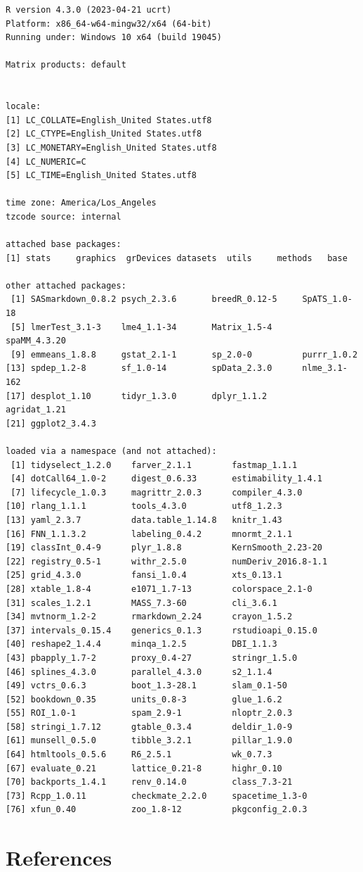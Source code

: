 \documentclass[
]{book}
\begin{document}
\begin{verbatim}
R version 4.3.0 (2023-04-21 ucrt)
Platform: x86_64-w64-mingw32/x64 (64-bit)
Running under: Windows 10 x64 (build 19045)

Matrix products: default


locale:
[1] LC_COLLATE=English_United States.utf8 
[2] LC_CTYPE=English_United States.utf8   
[3] LC_MONETARY=English_United States.utf8
[4] LC_NUMERIC=C                          
[5] LC_TIME=English_United States.utf8    

time zone: America/Los_Angeles
tzcode source: internal

attached base packages:
[1] stats     graphics  grDevices datasets  utils     methods   base     

other attached packages:
 [1] SASmarkdown_0.8.2 psych_2.3.6       breedR_0.12-5     SpATS_1.0-18     
 [5] lmerTest_3.1-3    lme4_1.1-34       Matrix_1.5-4      spaMM_4.3.20     
 [9] emmeans_1.8.8     gstat_2.1-1       sp_2.0-0          purrr_1.0.2      
[13] spdep_1.2-8       sf_1.0-14         spData_2.3.0      nlme_3.1-162     
[17] desplot_1.10      tidyr_1.3.0       dplyr_1.1.2       agridat_1.21     
[21] ggplot2_3.4.3    

loaded via a namespace (and not attached):
 [1] tidyselect_1.2.0    farver_2.1.1        fastmap_1.1.1      
 [4] dotCall64_1.0-2     digest_0.6.33       estimability_1.4.1 
 [7] lifecycle_1.0.3     magrittr_2.0.3      compiler_4.3.0     
[10] rlang_1.1.1         tools_4.3.0         utf8_1.2.3         
[13] yaml_2.3.7          data.table_1.14.8   knitr_1.43         
[16] FNN_1.1.3.2         labeling_0.4.2      mnormt_2.1.1       
[19] classInt_0.4-9      plyr_1.8.8          KernSmooth_2.23-20 
[22] registry_0.5-1      withr_2.5.0         numDeriv_2016.8-1.1
[25] grid_4.3.0          fansi_1.0.4         xts_0.13.1         
[28] xtable_1.8-4        e1071_1.7-13        colorspace_2.1-0   
[31] scales_1.2.1        MASS_7.3-60         cli_3.6.1          
[34] mvtnorm_1.2-2       rmarkdown_2.24      crayon_1.5.2       
[37] intervals_0.15.4    generics_0.1.3      rstudioapi_0.15.0  
[40] reshape2_1.4.4      minqa_1.2.5         DBI_1.1.3          
[43] pbapply_1.7-2       proxy_0.4-27        stringr_1.5.0      
[46] splines_4.3.0       parallel_4.3.0      s2_1.1.4           
[49] vctrs_0.6.3         boot_1.3-28.1       slam_0.1-50        
[52] bookdown_0.35       units_0.8-3         glue_1.6.2         
[55] ROI_1.0-1           spam_2.9-1          nloptr_2.0.3       
[58] stringi_1.7.12      gtable_0.3.4        deldir_1.0-9       
[61] munsell_0.5.0       tibble_3.2.1        pillar_1.9.0       
[64] htmltools_0.5.6     R6_2.5.1            wk_0.7.3           
[67] evaluate_0.21       lattice_0.21-8      highr_0.10         
[70] backports_1.4.1     renv_0.14.0         class_7.3-21       
[73] Rcpp_1.0.11         checkmate_2.2.0     spacetime_1.3-0    
[76] xfun_0.40           zoo_1.8-12          pkgconfig_2.0.3    
\end{verbatim}

\hypertarget{references}{%
\section{References}\label{references}}

  
\end{document}
